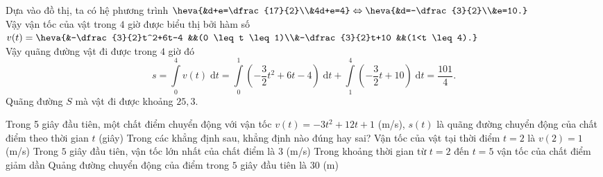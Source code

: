 \begin{bt}
{		Dựa vào đồ thị, ta có hệ phương trình $\heva{&d+e=\dfrac{17}{2}\\&4d+e=4} \Leftrightarrow \heva{&d=-\dfrac{3}{2}\\&e=10.}$\\
		Vậy vận tốc của vật trong $4$ giờ được biểu thị bởi hàm số $v(t)=\heva{&-\dfrac{3}{2}t^2+6t-4 &&(0 \leq t \leq 1)\\&-\dfrac{3}{2}t+10 &&(1<t \leq 4).}$\\
		Vậy quãng đường vật đi được trong $4$ giờ đó $$s=\displaystyle\int\limits_{0}^{4}v(t)\;\mathrm{d}t=\displaystyle\int\limits_{0}^{1}\left(-\dfrac{3}{2}t^2+6t-4\right)\;\mathrm{d}t+\displaystyle\int\limits_{1}^{4}\left(-\dfrac{3}{2}t+10\right)\;\mathrm{d}t=\dfrac{101}{4}.$$
		Quãng đường $S$ mà vật đi được khoảng $25,3$.
	}
\end{bt}

\begin{ex}%

	Trong 5 giây đầu tiên, một chất điểm chuyển động với vận tốc $v(t)=-3t^2+12t+1$ (m/s), $s(t)$ là quãng đường chuyển động của chất điểm theo thời gian $t$ (giây) Trong các khẳng định sau, khẳng định nào đúng hay sai?
	\choiceTF
	{Vận tốc của vật tại thời điểm $t=2$ là $v(2)=1$ (m/s) }
	{Trong $5$ giây đầu tiên, vận tốc lớn nhất của chất điểm là $3$ (m/s) }
	{\True Trong khoảng thời gian từ $t=2$ đến $t=5$ vận tốc của chất điểm giảm dần}
	{\True Quảng đường chuyển động của điểm trong $5$ giây  đầu tiên là $30$ (m)}
\end{ex}


